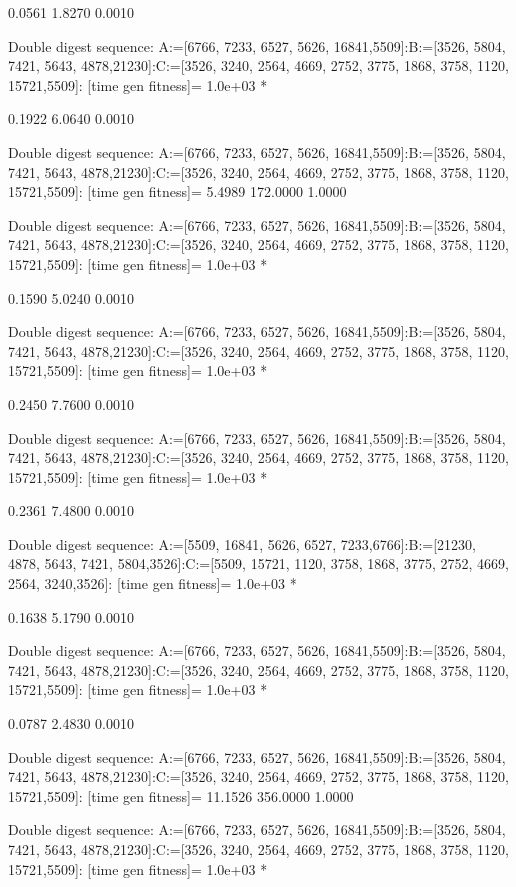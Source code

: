     0.0561    1.8270    0.0010

Double digest sequence:
A:=[6766, 7233, 6527, 5626, 16841,5509]:B:=[3526, 5804, 7421, 5643, 4878,21230]:C:=[3526, 3240, 2564, 4669, 2752, 3775, 1868, 3758, 1120, 15721,5509]:
[time gen fitness]=
   1.0e+03 *

    0.1922    6.0640    0.0010

Double digest sequence:
A:=[6766, 7233, 6527, 5626, 16841,5509]:B:=[3526, 5804, 7421, 5643, 4878,21230]:C:=[3526, 3240, 2564, 4669, 2752, 3775, 1868, 3758, 1120, 15721,5509]:
[time gen fitness]=
    5.4989  172.0000    1.0000

Double digest sequence:
A:=[6766, 7233, 6527, 5626, 16841,5509]:B:=[3526, 5804, 7421, 5643, 4878,21230]:C:=[3526, 3240, 2564, 4669, 2752, 3775, 1868, 3758, 1120, 15721,5509]:
[time gen fitness]=
   1.0e+03 *

    0.1590    5.0240    0.0010

Double digest sequence:
A:=[6766, 7233, 6527, 5626, 16841,5509]:B:=[3526, 5804, 7421, 5643, 4878,21230]:C:=[3526, 3240, 2564, 4669, 2752, 3775, 1868, 3758, 1120, 15721,5509]:
[time gen fitness]=
   1.0e+03 *

    0.2450    7.7600    0.0010

Double digest sequence:
A:=[6766, 7233, 6527, 5626, 16841,5509]:B:=[3526, 5804, 7421, 5643, 4878,21230]:C:=[3526, 3240, 2564, 4669, 2752, 3775, 1868, 3758, 1120, 15721,5509]:
[time gen fitness]=
   1.0e+03 *

    0.2361    7.4800    0.0010

Double digest sequence:
A:=[5509, 16841, 5626, 6527, 7233,6766]:B:=[21230, 4878, 5643, 7421, 5804,3526]:C:=[5509, 15721, 1120, 3758, 1868, 3775, 2752, 4669, 2564, 3240,3526]:
[time gen fitness]=
   1.0e+03 *

    0.1638    5.1790    0.0010

Double digest sequence:
A:=[6766, 7233, 6527, 5626, 16841,5509]:B:=[3526, 5804, 7421, 5643, 4878,21230]:C:=[3526, 3240, 2564, 4669, 2752, 3775, 1868, 3758, 1120, 15721,5509]:
[time gen fitness]=
   1.0e+03 *

    0.0787    2.4830    0.0010

Double digest sequence:
A:=[6766, 7233, 6527, 5626, 16841,5509]:B:=[3526, 5804, 7421, 5643, 4878,21230]:C:=[3526, 3240, 2564, 4669, 2752, 3775, 1868, 3758, 1120, 15721,5509]:
[time gen fitness]=
   11.1526  356.0000    1.0000

Double digest sequence:
A:=[6766, 7233, 6527, 5626, 16841,5509]:B:=[3526, 5804, 7421, 5643, 4878,21230]:C:=[3526, 3240, 2564, 4669, 2752, 3775, 1868, 3758, 1120, 15721,5509]:
[time gen fitness]=
   1.0e+03 *


